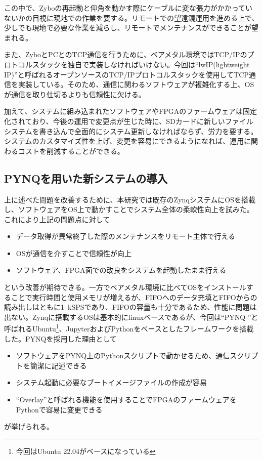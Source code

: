 この中で、Zyboの再起動と仰角を動かす際にケーブルに変な張力がかかっていないかの目視に現地での作業を要する。リモートでの望遠鏡運用を進める上で、少しでも現地で必要な作業を減らし、リモートでメンテナンスができることが望まれる。

また、ZyboとPCとのTCP通信を行うために、ベアメタル環境ではTCP/IPのプロトコルスタックを独自で実装しなければいけない。今回は``lwIP(lightweight IP)''と呼ばれるオープンソースのTCP/IPプロトコルスタックを使用してTCP通信を実装している。そのため、通信に関わるソフトウェアが複雑化する上、OSが通信を取り仕切るよりも信頼性に欠ける。

加えて、システムに組み込まれたソフトウェアやFPGAのファームウェアは固定化されており、今後の運用で変更点が生じた時に、SDカードに新しいファイルシステムを書き込んで全面的にシステム更新しなければならず、労力を要する。システムのカスタマイズ性を上げ、変更を容易にできるようになれば、運用に関わるコストを削減することができる。

\subsection{PYNQを用いた新システムの導入}
上に述べた問題を改善するために、本研究では既存のZynqシステムにOSを搭載し、ソフトウェアをOS上で動かすことでシステム全体の柔軟性向上を試みた。これにより上記の問題点に対して
\begin{itemize}
  \item データ取得が異常終了した際のメンテナンスをリモート主体で行える
  \item OSが通信を介すことで信頼性が向上
  \item ソフトウェア、FPGA面での改良をシステムを起動したまま行える
\end{itemize}
という改善が期待できる。一方でベアメタル環境に比べてOSをインストールすることで実行時間と使用メモリが増えるが、FIFOへのデータ充填とFIFOからの読み出しはともに\SI{1}{kSPS}であり、FIFOの容量も十分であるため、性能に問題は出ない。Zynqに搭載するOSは基本的にlinuxベースであるが、今回は``PYNQ \cite{Pynq}''と呼ばれるUbuntu\footnote{今回はUbuntu 22.04がベースになっている}、JupyterおよびPythonをベースとしたフレームワークを搭載した。PYNQを採用した理由として
\begin{itemize}
  \item ソフトウェアをPYNQ上のPythonスクリプトで動かせるため、通信スクリプトを簡潔に記述できる
  \item システム起動に必要なブートイメージファイルの作成が容易
  \item ``Overlay''と呼ばれる機能を使用することでFPGAのファームウェアをPythonで容易に変更できる
\end{itemize}
が挙げられる。

